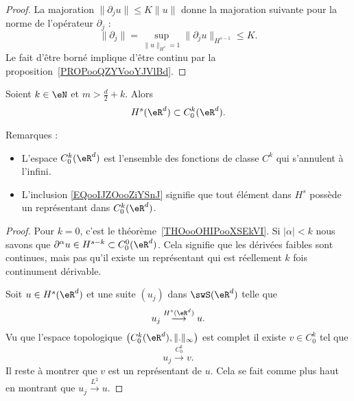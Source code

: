 \begin{proof}
    La majoration \( \| \partial_ju \|\leq K\| u \|\) donne la majoration suivante pour la norme de l'opérateur \( \partial_j\) :
    \begin{equation}
        \| \partial_j \|=\sup_{\| u \|_{H^s}=1}\| \partial_ju \|_{H^{s-1}}\leq K.
    \end{equation}
    Le fait d'être borné implique d'être continu par la proposition~\ref{PROPooQZYVooYJVlBd}.
\end{proof}

\begin{theorem}
    Soient \( k\in \eN\) et \( m>\frac{ d }{ 2 }+k\). Alors
    \begin{equation}        \label{EQooIJZOooZiYSnJ}
        H^s(\eR^d)\subset C_0^k(\eR^d).
    \end{equation}
\end{theorem}

Remarques :
\begin{itemize}
    \item
        L'espace \( C_0^k(\eR^d)\) est l'ensemble des fonctions de classe \( C^k\) qui s'annulent à l'infini.
    \item
        L'inclusion \eqref{EQooIJZOooZiYSnJ} signifie que tout élément dans \( H^s\) possède un représentant dans \( C_0^k(\eR^d)\).
\end{itemize}

\begin{proof}
    Pour \( k=0\), c'est le théorème~\ref{THOooOHIPooXSEkVI}. Si \( | \alpha |<k\) nous savons que \( \partial^{\alpha}u\in H^{s-k}\subset C_0^0(\eR^d) \). Cela signifie que les dérivées faibles sont continues, mais pas qu'il existe un représentant qui est réellement \( k\) fois continument dérivable.

    Soit \( u\in H^s(\eR^d)\) et une suite \( (u_j)  \) dans \( \swS(\eR^d)\) telle que
    \begin{equation}
        u_j\stackrel{H^s(\eR^d)}{\longrightarrow}u.
    \end{equation}
    Vu que l'espace topologique \( \big( C_0^k(\eR^d),\| . \|_{\infty} \big)\) est complet il existe \( v\in C_0^k\) tel que
    \begin{equation}
        u_j\stackrel{C_0^k}{\longrightarrow}v.
    \end{equation}
    Il reste à montrer que \( v\) est un représentant de \( u\). Cela se fait comme plus haut en montrant que \( u_j\stackrel{L^2}{\longrightarrow}u\).
\end{proof}

